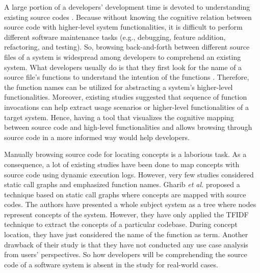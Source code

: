 A large portion of a developers' development time is devoted to understanding existing source codes \cite{corbi1989program, minelli2015know, ko2006exploratory}. Because without knowing the cognitive relation between source code with higher-level system functionalities, it is difficult to perform different software maintenance tasks (e.g., debugging, feature addition, refactoring, and testing). So, browsing back-and-forth between different source files of a system is widespread among developers to comprehend an existing system. What developers usually do is that they first look for the name of a source file's functions to understand the intention of the functions \cite{de2012IRMethodsArtifacts, starke2009searching}. Therefore, the function names can be utilized for abstracting a system's higher-level functionalities. Moreover, existing studies suggested that \cite{salah2005scenariographer,pradel2009automatic} sequence of function invocations can help extract usage scenarios or higher-level functionalities of a target system. Hence, having a tool that visualizes the cognitive mapping between source code and high-level functionalities and allows browsing through source code in a more informed way would help developers.

Manually browsing source code for locating concepts is a laborious task. As a consequence, a lot of existing studies have been done to map concepts with source code using dynamic execution logs. However, very few studies considered static call graphs and emphasized function names. Gharib \textit{et al.} \cite{gharibi2018automatic} proposed a technique based on static call graphs where concepts are mapped with source codes. The authors have presented a whole subject system as a tree where nodes represent concepts of the system. However, they have only applied the TFIDF technique to extract the concepts of a particular codebase. During concept location, they have just considered the name of the function as term. Another drawback of their study is that they have not conducted any use case analysis from users' perspectives. So how developers will be comprehending the source code of a software system is absent in the study for real-world cases.

